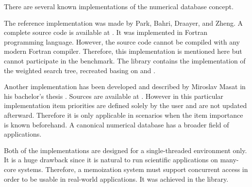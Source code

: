 There are several known implementations of the numerical database concept.

The reference implementation was made by Park, Bahri, Draayer, and Zheng. A complete source code is available at \cite{wstree}. It was implemented in Fortran programming language. However, the source code cannot be compiled with any modern Fortran compiler\cite{masat}. Therefore, this implementation is mentioned here but cannot participate in the benchmark. The \numdbname library contains the implementation of the weighted search tree, recreated basing on \cite{park90} and \cite{park94}.

Another implementation has been developed and described by Miroslav Masat in his bachelor’s thesis \cite{masat}. Sources are available at \cite{ccherish}. However in this particular implementation item priorities are defined solely by the user and are not updated afterward. Therefore it is only applicable in scenarios when the item importance is known beforehand. A canonical numerical database has a broader field of applications.

Both of the implementations are designed for a single-threaded environment only. It is a huge drawback since it is natural to run scientific applications on many-core systems. Therefore, a memoization system must support concurrent access in order to be usable in real-world applications. It was achieved in the \numdbname library.
